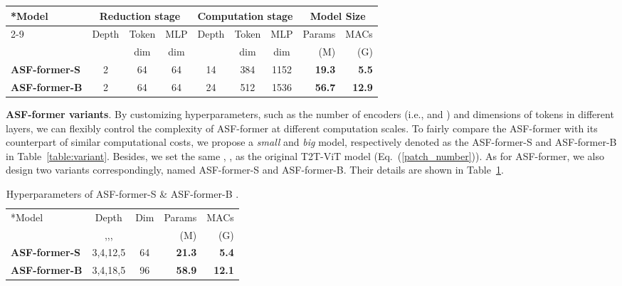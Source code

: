 \documentclass[lettersize,journal]{IEEEtran}
\begin{document}
\setlength{\tabcolsep}{8pt}
\begin{table*}
\begin{center}
\caption{Hyperparameters of ASF-former-S \& ASF-former-B .}
\label{table:variant}
\begin{tabular}{l|ccc|ccc|rr}
\hline\noalign{\smallskip}
\multirow{3}*{Model} &\multicolumn{3}{c}{Reduction stage} &\multicolumn{3}{c}{Computation stage} &\multicolumn{2}{c}{Model Size}\\
 \cline{2-9}
 &Depth &Token &MLP &Depth &Token &MLP &Params &MACs\\
 & &dim  &dim & &dim  &dim &(M) &(G)\\
\noalign{\smallskip}
\hline
\noalign{\smallskip}
\textbf{ASF-former-S} &2 &64 &64 &14 &384 &1152 &\textbf{19.3} &\textbf{5.5}\\
\textbf{ASF-former-B} &2 &64 &64 &24 &512 &1536 &\textbf{56.7} &\textbf{12.9}\\
\hline
\end{tabular}
\end{center}
\end{table*}
\setlength{\tabcolsep}{1.4pt}

\textbf{ASF-former variants}. By customizing hyperparameters, such as the number of encoders (i.e.,  and ) and dimensions of tokens in different layers, we can flexibly control the complexity of ASF-former at different computation scales. To fairly compare the ASF-former with its counterpart of similar computational costs, we propose a \textit{small} and \textit{big} model, respectively denoted as the ASF-former-S and ASF-former-B in Table~\ref{table:variant}. Besides, we set the same , ,  as the original T2T-ViT model (Eq.~(\ref{patch_number})). As for ASF-former, we also design two variants correspondingly, named ASF-former-S and ASF-former-B. Their details are shown in Table~\ref{table:variant_p}.

\setlength{\tabcolsep}{8pt}
\begin{table}
\begin{center}
\caption{Hyperparameters of ASF-former-S \& ASF-former-B .}
\label{table:variant_p}
\begin{tabular}{l|cc|rr}
\hline\noalign{\smallskip}
\multirow{2}*{Model} &Depth &Dim &Params &MACs\\
 &,,, & &(M) &(G)\\
\noalign{\smallskip}
\hline
\noalign{\smallskip}
\textbf{ASF-former-S} &3,4,12,5 &64 &\textbf{21.3} &\textbf{5.4}\\
\textbf{ASF-former-B} &3,4,18,5 &96 &\textbf{58.9} &\textbf{12.1}\\
\hline
\end{tabular}
\end{center}
\end{table}
\setlength{\tabcolsep}{1.4pt}
\end{document}
